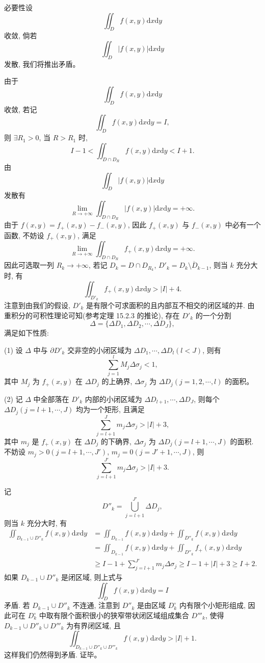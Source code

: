 \documentclass[UTF8,12pt,a4paper,fontset=fandol]{ctexart}
\begin{document}
必要性\quad 设
\[
  \iint_D f(x,y)\mathrm dx\mathrm dy
\]
收敛, 倘若
\[
  \iint_D |f(x,y)|\mathrm dx\mathrm dy
\]
发散, 我们将推出矛盾。

由于
\[
  \iint_D f(x,y)\mathrm dx\mathrm dy
\]
收敛, 若记
\[
  \iint_D f(x,y)\mathrm dx\mathrm dy=I,
\]
则 $\exists R_1>0$, 当 $R>R_1$ 时,
\[
  I-1<\iint_{D\cap D_R}f(x,y)\mathrm dx\mathrm dy<I+1.
\]
由
\[
  \iint_D |f(x,y)|\mathrm dx\mathrm dy
\]
发散有
\[
  \lim_{R\to+\infty}\iint_{D\cap D_R}|f(x,y)|\mathrm dx\mathrm dy=+\infty.
\]
由于 $f(x,y)=f_+(x,y)-f_-(x,y)$, 因此 $f_+(x,y)$ 与 $f_-(x,y)$ 中必有一个函数, 不妨设 $f_+(x,y)$, 满足
\[
  \lim_{R\to+\infty}\iint_{D\cap D_R}f_+(x,y)\mathrm dx\mathrm dy=+\infty.
\]
因此可选取一列 $R_k\to+\infty$, 若记 $D_k=D\cap D_{R_k}$, $D'_k=\overline{D_k\setminus D_{k-1}}$, 则当 $k$ 充分大时, 有
\[
  \iint_{D'_k}f_+(x,y)\mathrm dx\mathrm dy>|I|+4.
\]
注意到由我们的假设, $D'_k$ 是有限个可求面积的且内部互不相交的闭区域的并. 由重积分的可积性理论可知(参考定理 15.2.3 的推论), 存在 $D'_k$ 的一个分割
\[
  \Delta=\{\Delta D_1,\Delta D_2,\cdots,\Delta D_J\},
\]
满足如下性质:

(1) 设 $\Delta$ 中与 $\partial D'_k$ 交非空的小闭区域为 $\Delta D_1,\cdots,\Delta D_l(l<J)$, 则有
\[
  \sum_{j=1}^l M_j\Delta\sigma_j<1,
\]
其中 $M_j$ 为 $f_+(x,y)$ 在 $\Delta D_j$ 的上确界, $\Delta\sigma_j$ 为 $\Delta D_j(j=1,2,\cdots,l)$ 的面积。

(2) 记 $\Delta$ 中全部落在 $D'_k$ 内部的小闭区域为 $\Delta D_{l+1},\cdots,\Delta D_J$, 则每个 $\Delta D_j(j=l+1,\cdots,J)$ 均为一个矩形, 且满足
\[
  \sum_{j=l+1}^J m_j\Delta\sigma_j>|I|+3,
\]
其中 $m_j$ 是 $f_+(x,y)$ 在 $\Delta D_j$ 的下确界, $\Delta\sigma_j$ 为 $\Delta D_j(j=l+1,\cdots,J)$ 的面积. 不妨设 $m_j>0(j=l+1,\cdots,J')$, $m_j=0(j=J'+1,\cdots,J)$, 则
\[
  \sum_{j=l+1}^{J'}m_j\Delta\sigma_j>|I|+3.
\]

记
\[
  D''_k=\bigcup_{j=l+1}^{J'}\Delta D_j,
\]
则当 $k$ 充分大时, 有
\[
\begin{aligned}
  \iint_{D_{k-1}\cup D''_k}f(x,y)\mathrm dx\mathrm dy
  &=\iint_{D_{k-1}}f(x,y)\mathrm dx\mathrm dy
  +\iint_{D''_k}f(x,y)\mathrm dx\mathrm dy\\
  &=\iint_{D_{k-1}}f(x,y)\mathrm dx\mathrm dy
  +\iint_{D''_k}f_+(x,y)\mathrm dx\mathrm dy\\
  &\geqslant I-1+\sum_{j=l+1}^{J'}m_j\Delta\sigma_j
  \geqslant I-1+|I|+3\geqslant I+2.
\end{aligned}
\]
如果 $D_{k-1}\cup D''_k$ 是闭区域, 则上式与
\[
  \iint_D f(x,y)\mathrm dx\mathrm dy=I
\]
矛盾. 若 $D_{k-1}\cup D''_k$ 不连通, 注意到 $D''_k$ 是由区域 $D_k^\circ$ 内有限个小矩形组成, 因此可在 $D_k^\circ$ 中取有限个面积很小的狭窄带状闭区域组成集合 $D'''_k$, 使得 $D_{k-1}\cup D''_k\cup D'''_k$ 为有界闭区域, 且
\[
  \iint_{D_{k-1}\cup D''_k\cup D'''_k}f(x,y)\mathrm dx\mathrm dy>|I|+1.
\]
这样我们仍然得到矛盾. 证毕。
\end{document}
